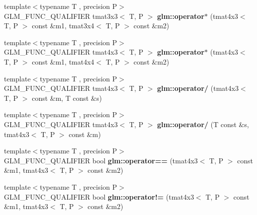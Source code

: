 \begin{DoxyCompactItemize}
\item 
\hypertarget{namespaceglm_a1364c0e61de6a2c9a51c10c390cb0d99}{{\footnotesize template$<$typename T , precision P$>$ }\\G\-L\-M\-\_\-\-F\-U\-N\-C\-\_\-\-Q\-U\-A\-L\-I\-F\-I\-E\-R tmat3x3$<$ T, P $>$ {\bfseries glm\-::operator$\ast$} (tmat4x3$<$ T, P $>$ const \&m1, tmat3x4$<$ T, P $>$ const \&m2)}\label{namespaceglm_a1364c0e61de6a2c9a51c10c390cb0d99}

\item 
\hypertarget{namespaceglm_abd440e86d32d7fdf501cea387d566799}{{\footnotesize template$<$typename T , precision P$>$ }\\G\-L\-M\-\_\-\-F\-U\-N\-C\-\_\-\-Q\-U\-A\-L\-I\-F\-I\-E\-R tmat4x3$<$ T, P $>$ {\bfseries glm\-::operator$\ast$} (tmat4x3$<$ T, P $>$ const \&m1, tmat4x4$<$ T, P $>$ const \&m2)}\label{namespaceglm_abd440e86d32d7fdf501cea387d566799}

\item 
\hypertarget{namespaceglm_ae7004574df6323d999b0a1be72ac72d6}{{\footnotesize template$<$typename T , precision P$>$ }\\G\-L\-M\-\_\-\-F\-U\-N\-C\-\_\-\-Q\-U\-A\-L\-I\-F\-I\-E\-R tmat4x3$<$ T, P $>$ {\bfseries glm\-::operator/} (tmat4x3$<$ T, P $>$ const \&m, T const \&s)}\label{namespaceglm_ae7004574df6323d999b0a1be72ac72d6}

\item 
\hypertarget{namespaceglm_ad3cad8f5fbca99608719dbab6c2c3537}{{\footnotesize template$<$typename T , precision P$>$ }\\G\-L\-M\-\_\-\-F\-U\-N\-C\-\_\-\-Q\-U\-A\-L\-I\-F\-I\-E\-R tmat4x3$<$ T, P $>$ {\bfseries glm\-::operator/} (T const \&s, tmat4x3$<$ T, P $>$ const \&m)}\label{namespaceglm_ad3cad8f5fbca99608719dbab6c2c3537}

\item 
\hypertarget{namespaceglm_a26d8f492037c0d9932f3dcdc1f5ad329}{{\footnotesize template$<$typename T , precision P$>$ }\\G\-L\-M\-\_\-\-F\-U\-N\-C\-\_\-\-Q\-U\-A\-L\-I\-F\-I\-E\-R bool {\bfseries glm\-::operator==} (tmat4x3$<$ T, P $>$ const \&m1, tmat4x3$<$ T, P $>$ const \&m2)}\label{namespaceglm_a26d8f492037c0d9932f3dcdc1f5ad329}

\item 
\hypertarget{namespaceglm_ab5df48e5151769b6a258c2c3f2699e9c}{{\footnotesize template$<$typename T , precision P$>$ }\\G\-L\-M\-\_\-\-F\-U\-N\-C\-\_\-\-Q\-U\-A\-L\-I\-F\-I\-E\-R bool {\bfseries glm\-::operator!=} (tmat4x3$<$ T, P $>$ const \&m1, tmat4x3$<$ T, P $>$ const \&m2)}\label{namespaceglm_ab5df48e5151769b6a258c2c3f2699e9c}

\end{DoxyCompactItemize}


